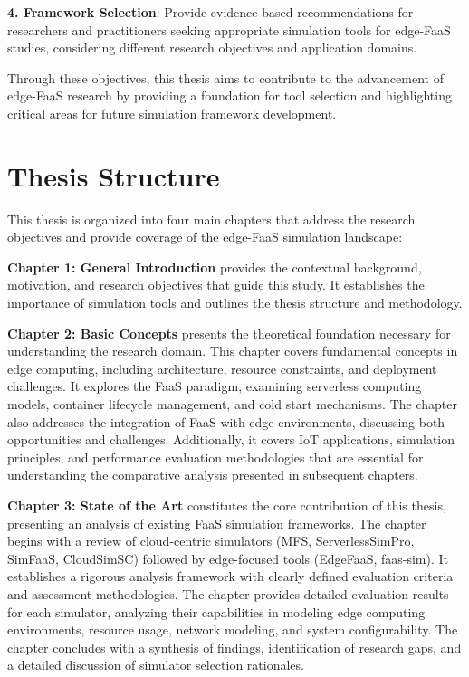\textbf{4. Framework Selection}: Provide evidence-based recommendations for researchers and practitioners seeking appropriate simulation tools for edge-FaaS studies, considering different research objectives and application domains.

Through these objectives, this thesis aims to contribute to the advancement of edge-FaaS research by providing a foundation for tool selection and highlighting critical areas for future simulation framework development.

\section{Thesis Structure}

This thesis is organized into four main chapters that address the research objectives and provide coverage of the edge-FaaS simulation landscape:

\textbf{Chapter 1: General Introduction} provides the contextual background, motivation, and research objectives that guide this study. It establishes the importance of simulation tools and outlines the thesis structure and methodology.

\textbf{Chapter 2: Basic Concepts} presents the theoretical foundation necessary for understanding the research domain. This chapter covers fundamental concepts in edge computing, including architecture, resource constraints, and deployment challenges. It explores the FaaS paradigm, examining serverless computing models, container lifecycle management, and cold start mechanisms. The chapter also addresses the integration of FaaS with edge environments, discussing both opportunities and challenges. Additionally, it covers IoT applications, simulation principles, and performance evaluation methodologies that are essential for understanding the comparative analysis presented in subsequent chapters.

\textbf{Chapter 3: State of the Art} constitutes the core contribution of this thesis, presenting an analysis of existing FaaS simulation frameworks. The chapter begins with a review of cloud-centric simulators (MFS, ServerlessSimPro, SimFaaS, CloudSimSC) followed by edge-focused tools (EdgeFaaS, faas-sim). It establishes a rigorous analysis framework with clearly defined evaluation criteria and assessment methodologies. The chapter provides detailed evaluation results for each simulator, analyzing their capabilities in modeling edge computing environments, resource usage, network modeling, and system configurability. The chapter concludes with a synthesis of findings, identification of research gaps, and a detailed discussion of simulator selection rationales.

